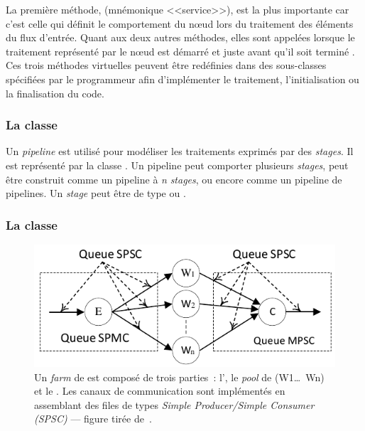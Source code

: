 La premi\`ere m\'ethode,  (mn\'emonique <<service>>), est la plus importante car c'est celle qui d\'efinit le comportement du nœud lors du traitement des \'el\'ements du flux d'entr\'ee. Quant aux deux autres m\'ethodes, elles sont appel\'ees lorsque le traitement repr\'esent\'e par le nœud est d\'emarr\'e  et juste avant qu'il soit termin\'e . Ces trois m\'ethodes virtuelles peuvent \^etre red\'efinies dans des sous-classes  sp\'ecifi\'ees par le programmeur afin d'impl\'ementer le traitement, l'initialisation ou la finalisation du code.


\subsubsection*{La classe }

Un \emph{pipeline} est utilis\'e pour mod\'eliser les traitements exprim\'es par des \emph{stages}. Il est repr\'esent\'e par la classe . Un {pipeline} peut comporter plusieurs \emph{stages}, peut \^etre construit comme un pipeline \`a \emph{n} \emph{stages}, ou encore comme un {pipeline} de {pipelines}. Un \emph{stage} peut \^etre de type  ou .


\goodbreak

\subsubsection*{La classe }
\label{farm.sect}

\begin{figure}	%
     \centering
     \includegraphics[width=1.0\textwidth]{Figures/FastFlowFarm.pdf}
      \caption[Les trois parties d'un \emph{farm} de .]{Un \emph{farm} de  est compos\'e de trois parties~:  l', le \emph{pool} de  (W1\ldots\ Wn) et le . Les canaux de communication sont impl\'ement\'es en assemblant des files de types \emph{Simple Producer/Simple Consumer (SPSC)} --- figure tir\'ee de~\citep{aldinucci2010efficient}.}
       \label{FastFlowFarm.fig}
\end{figure}

